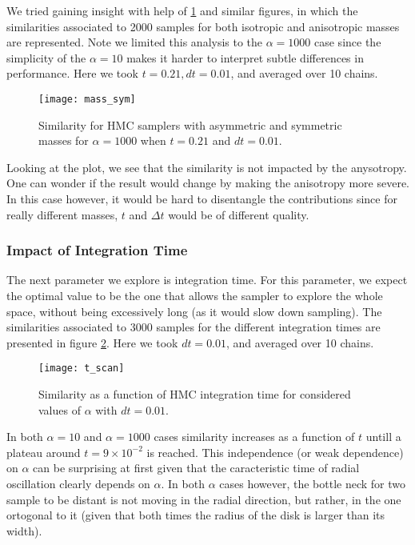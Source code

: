 \documentclass[a4paper, 12pt,oneside]{article}
\begin{document}
			We tried gaining insight with help of \ref{fig:mass-sym} and similar figures, in which the similarities associated to 2000 samples for both isotropic and anisotropic masses are represented. Note we limited this analysis to the $\alpha=1000$ case since the simplicity of the $\alpha=10$ makes it harder to interpret subtle differences in performance. Here we took $t=0.21,dt=0.01$, and averaged over 10 chains.  
			\begin{figure}[htb]
				\centering
					\vspace{0em}
					\texttt{[image: mass\_sym]}
					\caption{Similarity for HMC samplers with asymmetric and symmetric masses for $\alpha=1000$ when $t=0.21$ and $dt=0.01$.}
					\label{fig:mass-sym}
			\end{figure}
			Looking at the plot, we see that the similarity is not impacted by the anysotropy. One can wonder if the result would change by making the anisotropy more severe. In this case however, it would be hard to disentangle the contributions since for really different masses, $t$ and $\Delta t$ would be of different quality.  
			\subsubsection{Impact of Integration Time}
			The next parameter we explore is integration time. For this parameter, we expect the optimal value to be the one that allows the sampler to explore the whole space, without being excessively long (as it would slow down sampling).
			The similarities associated to 3000 samples for the different integration times are presented in figure \ref{fig:t-scan}. Here we took $dt=0.01$, and averaged over 10 chains.  
			\begin{figure}[htb]
				\centering
					\vspace{0em}
					\texttt{[image: t\_scan]}
					\caption{Similarity as a function of HMC integration time for considered values of $\alpha$ with $dt=0.01$.}
					\label{fig:t-scan}
			\end{figure}
			In both $\alpha=10$ and $\alpha=1000$ cases similarity increases as a function of $t$ untill a plateau around $t=9\times 10^{-2}$ is reached. This independence (or weak dependence) on $\alpha$ can be surprising at first given that the caracteristic time of radial oscillation clearly depends on $\alpha$. In both $\alpha$ cases however, the bottle neck for two sample to be distant is not moving in the radial direction, but rather, in the one ortogonal to it (given that both times the radius of the disk is larger than its width).   
\end{document}

